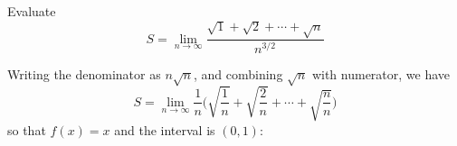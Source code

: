 \documentclass[11pt]{amsbook}
\begin{document}
\begin{exmp}
    Evaluate
    \[ 
        S = \lim _{n \rightarrow \infty} 
                \frac{
                   \sqrt{1} + 
                   \sqrt{2} + 
                   \cdots + 
                   \sqrt{n}
                }{ n^{3/2} } 
    \]
    \begin{hSolution}
        Writing the denominator as $n\sqrt{n}$, and combining $\sqrt{n}$ with numerator, we have
            \[ 
                S = \lim _{n\rightarrow \infty} 
                        \frac{1}{n} 
                        \Big( 
                            \sqrt{ \frac{1}{n} } + 
                            \sqrt{\frac{2}{n}} + 
                            \cdots + 
                            \sqrt{\frac{n}{n}}
                        \Big) 
            \]
        so that $f(x) = x$ and the interval is $(0,1)$:
    \end{hSolution}
\end{exmp}

\end{document}
